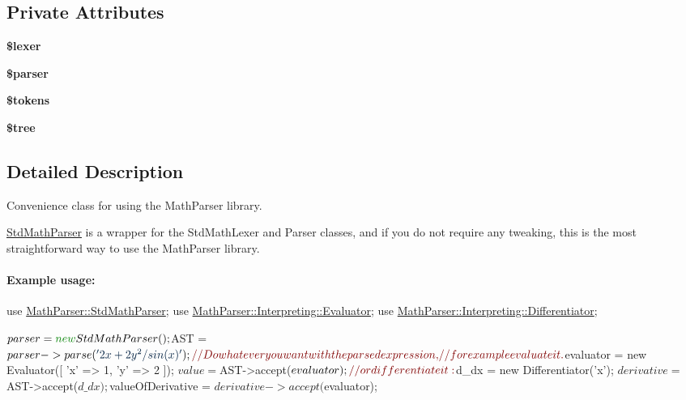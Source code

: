 \subsection*{Private Attributes}
\begin{DoxyCompactItemize}
\item 
\hypertarget{classMathParser_1_1StdMathParser_ab6946ba25d66a75b424eae04d5cb070d}{{\bfseries \$lexer}}\label{classMathParser_1_1StdMathParser_ab6946ba25d66a75b424eae04d5cb070d}

\item 
\hypertarget{classMathParser_1_1StdMathParser_abd2f22d467ff3c59cf47907209baa6cd}{{\bfseries \$parser}}\label{classMathParser_1_1StdMathParser_abd2f22d467ff3c59cf47907209baa6cd}

\item 
\hypertarget{classMathParser_1_1StdMathParser_a7df1405869c2a0fdc4cbe8a47fe24b79}{{\bfseries \$tokens}}\label{classMathParser_1_1StdMathParser_a7df1405869c2a0fdc4cbe8a47fe24b79}

\item 
\hypertarget{classMathParser_1_1StdMathParser_a520e08ff2d81d78f211e11ed7d9b8a23}{{\bfseries \$tree}}\label{classMathParser_1_1StdMathParser_a520e08ff2d81d78f211e11ed7d9b8a23}

\end{DoxyCompactItemize}


\subsection{Detailed Description}
Convenience class for using the Math\-Parser library. 

\hyperlink{classMathParser_1_1StdMathParser}{Std\-Math\-Parser} is a wrapper for the Std\-Math\-Lexer and Parser classes, and if you do not require any tweaking, this is the most straightforward way to use the Math\-Parser library.

\paragraph*{Example usage\-:}


\begin{DoxyCode}
use \hyperlink{classMathParser_1_1StdMathParser}{MathParser::StdMathParser};
use \hyperlink{classMathParser_1_1Interpreting_1_1Evaluator}{MathParser::Interpreting::Evaluator};
use \hyperlink{classMathParser_1_1Interpreting_1_1Differentiator}{MathParser::Interpreting::Differentiator};

$parser = \textcolor{keyword}{new} StdMathParser();
$AST = $parser->parse(\textcolor{stringliteral}{'2x + 2y^2/sin(x)'});

\textcolor{comment}{// Do whatever you want with the parsed expression,}
\textcolor{comment}{// for example evaluate it.}
$evaluator = \textcolor{keyword}{new} Evaluator([ \textcolor{charliteral}{'x'} => 1, \textcolor{charliteral}{'y'} => 2 ]);
$value = $AST->accept($evaluator);

\textcolor{comment}{// or differentiate it:}
$d\_dx = \textcolor{keyword}{new} Differentiator(\textcolor{charliteral}{'x'});
$derivative = $AST->accept($d\_dx);
$valueOfDerivative = $derivative->accept($evaluator);
\end{DoxyCode}
 

